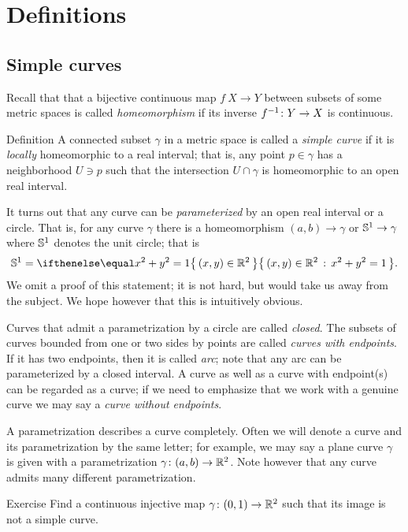 \chapter{Definitions}


\section*{Simple curves}

Recall that that a bijective continuous map $f\:X\to Y$ between subsets of some metric spaces is called \emph{homeomorphism} if its inverse $f^{-1}\:Y\z\to X$ is continuous.  

\begin{thm}{Definition} 
A connected subset $\gamma$ in a metric space is called a \emph{simple curve} if it is \emph{locally} homeomorphic to a real interval; that is, any point $p\in\gamma$ has a neighborhood $U\ni p$ such that the intersection
$U\cap \gamma$ is homeomorphic to an open real interval.
\end{thm}

It turns out that any curve can be \emph{parameterized} by an open real interval or a circle.
That is, for any curve $\gamma$ there is a homeomorphism $(a,b)\to\gamma$ or $\mathbb{S}^1\to\gamma$ 
where $\mathbb{S}^1$ denotes the unit circle; that is 
\[\SS^1=\set{(x,y)\in\RR^2}{x^2+y^2=1}.\]
We omit a proof of this statement; it is not hard, but would take us away from the subject.
We hope however that this is intuitively obvious. %

Curves that admit a parametrization by a circle are called \emph{closed}.
The subsets of curves bounded from one or two sides by points are called \emph{curves with endpoints}.
If it has two endpoints, then it is called \emph{arc}; note that any arc can be parameterized by a closed interval.
A curve as well as a curve with endpoint(s) can be regarded as a curve;
if we need to emphasize that we work with a genuine curve we may say a \emph{curve without endpoints}.


A parametrization describes a curve completely.
Often we will denote a curve and its parametrization by the same letter;
for example, we may say a plane curve $\gamma$ is given with a parametrization $\gamma\colon(a,b)\to \mathbb{R}^2$.
Note however that any curve admits many different parametrization. 

\begin{thm}{Exercise}\label{ex:9}
Find a continuous injective map $\gamma\colon(0,1)\to\mathbb{R}^2$ such that its image is not a simple curve.
\end{thm}


